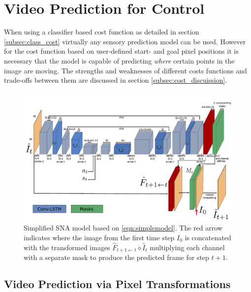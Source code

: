 \section{Video Prediction for Control}

When using a classifier based cost function as detailed in section \ref{subsec:class_cost} virtually any sensory prediction model can be used. However for the cost function based on user-defined start- and goal pixel positions it is necessary that the model is capable of predicting \emph{where} certain points in the image are moving. The strengths and weaknesses of different costs functions and trade-offs between them are discussed in section \ref{subsec:cost_discuission}.

\begin{figure}[t]
    \centering
    \includegraphics[width=\columnwidth]{images_sna/occlusionaware/architecture.pdf}
    \caption{\small{Simplified SNA model based on \autoref{eqn:simplemodel}. The red arrow indicates where the image from the first time step $I_0$ is concatenated with the transformed images $\hat{F}_{t+1 \leftarrow t} \diamond  \hat{I}_t $ multiplying each channel with a separate mask to produce the predicted frame for step $t+1$.}}      \label{fig:occlusion_model}
\end{figure}

\subsection{Video Prediction via Pixel Transformations}
\label{sec:model}

